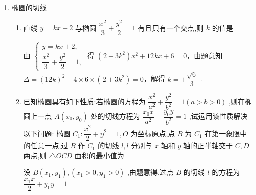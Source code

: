\begin{enumerate}
\begin{enumerate}
\begin{jieda}
            $k_1k_4 = \dfrac{y_1y_2}{t^2y_1y_2 + (m+4)t(y_1+y_2) + (m+4)^2} \\
            = \dfrac{3m^2-48}{t^2(3m^2-48)+(m+4)(-6mt^2)+(m+4)^2(3t^2+4)} = \dfrac{3(m-4)}{4(m+4)}= -\dfrac{5}{4}$，解得$m = -1$

            故$PQ$恒过$(-1, 0)$，故${S}_{\bigtriangleup {F_2PQ}} = \dfrac{3}{2}|y_1-y_2| = \dfrac{18\sqrt{4t^2+5}}{3t^2+4}$

            设 $\sqrt{4{t}^{2} + 5} = \lambda$ ,则 ${t}^{2} = \dfrac{{\lambda }^{2} - 5}{4}$ ,由 $l$ 与 $x$ 轴不垂直得 $\lambda  > \sqrt{5}$，且 ${S}_{\bigtriangleup {F}_{2}{PQ}} = \dfrac{{18}\sqrt{4{t}^{2} + 5}}{3{t}^{2} + 4} = \dfrac{72\lambda }{3{\lambda }^{2} + 1} = \dfrac{72}{{3\lambda } + \dfrac{1}{\lambda }}$

            因为函数 $y = \dfrac{72}{{3x} + \dfrac{1}{x}}$ 在 $\lbrack \sqrt{5}, + \infty )$ 上为减函数,所以 ${S}_{\bigtriangleup {F}_{2}{PQ}}$ 的取值范围为 $\left( {0,\dfrac{9\sqrt{5}}{2}}\right)$ .
        \end{jieda}
    \end{enumerate}

    
    \item 椭圆的切线
    \begin{enumerate}
        \item 直线 $y = {kx} + 2$ 与椭圆 $\dfrac{{x}^{2}}{3} + \dfrac{{y}^{2}}{2} = 1$ 有且只有一个交点,则 $k$ 的值是
        \begin{jieda}
            由 $\left\{  \begin{array}{l} y = {kx} + 2, \\  \dfrac{{x}^{2}}{3} + \dfrac{{y}^{2}}{2} = 1, \end{array}\right.$ 得 $\left( {2 + 3{k}^{2}}\right) {x}^{2} + {12kx} + 6 = 0$，由题意知 $\Delta  = {\left( {12}k\right) }^{2} - 4 \times  6 \times  \left( {2 + 3{k}^{2}}\right)  = 0$，解得 $k =  \pm  \dfrac{\sqrt{6}}{3}$ .
        \end{jieda}
        \item 已知椭圆具有如下性质:若椭圆的方程为 $\dfrac{{x}^{2}}{{a}^{2}} + \dfrac{{y}^{2}}{{b}^{2}} = 1\left( {a > b > 0}\right)$ ,则在椭圆上一点 $A\left( {{x}_{0},{y}_{0}}\right)$ 处的切线方程为 $\dfrac{{x}_{0}x}{{a}^{2}} + \dfrac{{y}_{0}y}{{b}^{2}} = 1$ ,试运用该性质解决以下问题: 椭圆 ${C}_{1} : \dfrac{{x}^{2}}{2} + {y}^{2} = 1,O$ 为坐标原点,点 $B$ 为 ${C}_{1}$ 在第一象限中的任意一点,过 $B$ 作 ${C}_{1}$ 的切线 $l,l$ 分别与 $x$ 轴和 $y$ 轴的正半轴交于 $C,D$ 两点,则 $\bigtriangleup  {OCD}$ 面积的最小值为
        \begin{jieda}
            设 $B\left( {{x}_{1},{y}_{1}}\right) ,\left( {{x}_{1} > 0,{y}_{1} > 0}\right)$ ,由题意得,过点 $B$ 的切线 $l$ 的方程为 $\dfrac{{x}_{1}x}{2} + {y}_{1}y = 1$ 
            

\end{jieda}
\end{enumerate}
\end{enumerate}
